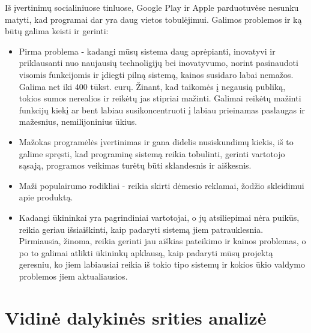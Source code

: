 \documentclass[oneside]{VUMIFPSkursinis}
\begin{document}
Iš įvertinimų socialiniuose tinluose, Google Play ir Apple parduotuvėse nesunku matyti, kad programai dar yra daug vietos tobulėjimui. Galimos problemos ir ką būtų galima keisti ir gerinti:
\begin{itemize}
\item Pirma problema -  kadangi mūsų sistema daug aprėpianti, inovatyvi ir priklausanti nuo naujausių technoligijų bei inovatyvumo, norint pasinaudoti visomis funkcijomis ir įdiegti pilną sistemą, kainos susidaro labai nemažos. Galima net iki 400 tūkst. eurų. Žinant, kad taikomės į negausią publiką, tokios sumos nerealios ir reikėtų jas stipriai mažinti. Galimai reikėtų mažinti funkcijų kiekį ar bent labiau susikoncentruoti į labiau prieinamas paslaugas ir mažesnius, nemilijoninius ūkius.
\item Mažokas programėlės įvertinimas ir gana didelis nusiskundimų kiekis, iš to galime spręsti, kad programinę sistemą reikia tobulinti, gerinti vartotojo sąsają, programos veikimas turėtų būti sklandesnis ir aiškesnis.
\item Maži populairumo rodikliai - reikia skirti dėmesio reklamai, žodžio skleidimui apie produktą.
\item Kadangi ūkininkai yra pagrindiniai vartotojai, o jų atsiliepimai nėra puikūs, reikia geriau išsiaiškinti, kaip padaryti sistemą jiem patrauklesnia. Pirmiausia, žinoma, reikia gerinti jau aiškias pateikimo ir kainos problemas, o po to galimai atlikti ūkininkų apklausą, kaip padaryti mūsų projektą geresniu, ko jiem labiausiai reikia iš tokio tipo sistemų ir kokios ūkio valdymo problemos jiem aktualiausios.
\end{itemize}
	
	
	
\section{Vidinė dalykinės srities analizė}
\end{document}
